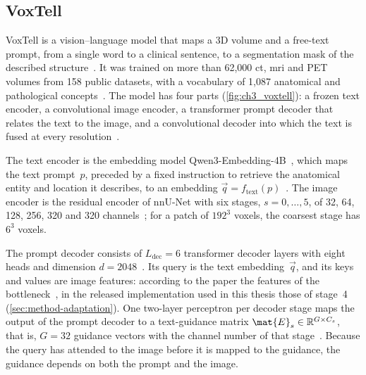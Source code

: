 \subsection{VoxTell}
\label{subsec:bg-voxtell}

VoxTell is a vision--language model that maps a 3D volume and a free-text prompt, from a single word to a clinical sentence, to a segmentation mask of the described structure~\cite[p.~1]{rokuss2025voxtellfreetextpromptableuniversal}.
It was trained on more than 62{,}000 \gls{ct}, \gls{mri} and PET volumes from 158 public datasets, with a vocabulary of 1{,}087 anatomical and pathological concepts~\cite[p.~4]{rokuss2025voxtellfreetextpromptableuniversal}.
The model has four parts (\cref{fig:ch3_voxtell}): a frozen text encoder, a convolutional image encoder, a transformer prompt decoder that relates the text to the image, and a convolutional decoder into which the text is fused at every resolution~\cite[Sec.~3]{rokuss2025voxtellfreetextpromptableuniversal}.

The text encoder is the embedding model Qwen3-Embedding-4B~\cite{zhang2025qwen3embedding}, which maps the text prompt~$p$, preceded by a fixed instruction to retrieve the anatomical entity and location it describes, to an embedding $\vec{q} = f_{\mathrm{text}}(p)$~\cite[Eq.~2, S-p.~1]{rokuss2025voxtellfreetextpromptableuniversal}.
The image encoder is the residual encoder of nnU-Net with six stages, $s = 0, \dots, 5$, of 32, 64, 128, 256, 320 and 320 channels~\cite[S-p.~1]{rokuss2025voxtellfreetextpromptableuniversal}; for a patch of $192^3$ voxels, the coarsest stage has $6^3$ voxels.

The prompt decoder consists of $L_{\mathrm{dec}} = 6$ transformer decoder layers with eight heads and dimension $d = 2048$~\cite[Sec.~3]{rokuss2025voxtellfreetextpromptableuniversal}.
Its query is the text embedding~$\vec{q}$, and its keys and values are image features: according to the paper the features of the bottleneck~\cite[Eq.~3]{rokuss2025voxtellfreetextpromptableuniversal}, in the released implementation used in this thesis those of stage~4 (\cref{sec:method-adaptation}).
One two-layer perceptron per decoder stage maps the output of the prompt decoder to a text-guidance matrix $\mat{E}_s \in \mathbb{R}^{G \times C_s}$, that is, $G = 32$ guidance vectors with the channel number of that stage~\cite[Sec.~3, S-p.~1]{rokuss2025voxtellfreetextpromptableuniversal}.
Because the query has attended to the image before it is mapped to the guidance, the guidance depends on both the prompt and the image.

